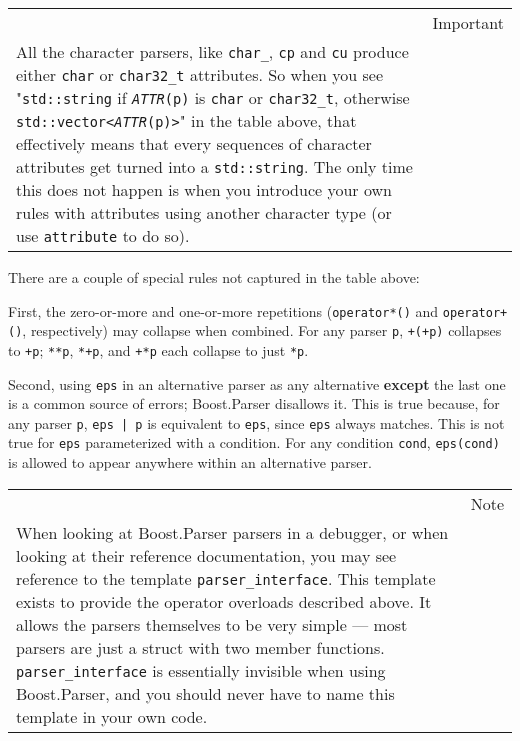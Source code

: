 \hfill\break

\begin{longtable}[]{@{}
  >{\raggedright\arraybackslash}p{}
  >{\raggedright\arraybackslash}p{}@{}}
\toprule\noalign{}
\endhead
\bottomrule\noalign{}
\endlastfoot
\begin{minipage}[t]{\linewidth}\raggedright
\end{minipage} & Important \\
All the character parsers, like \texttt{char\_}, \texttt{cp} and \texttt{cu} produce either \texttt{char} or \texttt{char32\_t} attributes. So when you see "\texttt{std::string} if \emph{\texttt{ATTR}}\texttt{(p)} is \texttt{char} or \texttt{char32\_t}, otherwise \texttt{std::vector<}\emph{\texttt{ATTR}}\texttt{(p)>}" in the table above, that effectively means that every sequences of character attributes get turned into a \texttt{std::string}. The only time this does not happen is when you introduce your own rules with attributes using another character type (or use \texttt{attribute} to do so). & \\
\end{longtable}

There are a couple of special rules not captured in the table above:

First, the zero-or-more and one-or-more repetitions (\texttt{operator*()} and \texttt{operator+()}, respectively) may collapse when combined. For any parser \texttt{p}, \texttt{+(+p)} collapses to \texttt{+p}; \texttt{**p}, \texttt{*+p}, and \texttt{+*p} each collapse to just \texttt{*p}.

Second, using \texttt{eps} in an alternative parser as any alternative \textbf{except} the last one is a common source of errors; Boost.Parser disallows it. This is true because, for any parser \texttt{p}, \texttt{eps | p} is equivalent to \texttt{eps}, since \texttt{eps} always matches. This is not true for \texttt{eps} parameterized with a condition. For any condition \texttt{cond}, \texttt{eps(cond)} is allowed to appear anywhere within an alternative parser.

\begin{longtable}[]{@{}
  >{\raggedright\arraybackslash}p{}
  >{\raggedright\arraybackslash}p{}@{}}
\toprule\noalign{}
\endhead
\bottomrule\noalign{}
\endlastfoot
\begin{minipage}[t]{\linewidth}\raggedright
\end{minipage} & Note \\
When looking at Boost.Parser parsers in a debugger, or when looking at their reference documentation, you may see reference to the template \texttt{parser\_interface}. This template exists to provide the operator overloads described above. It allows the parsers themselves to be very simple --- most parsers are just a struct with two member functions. \texttt{parser\_interface} is essentially invisible when using Boost.Parser, and you should never have to name this template in your own code. & \\
\end{longtable}

